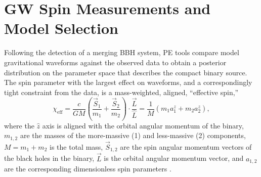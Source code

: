 \documentclass[modern,linenumbers]{aastex61}
\newcommand{\chieff}{\chi_\mathrm{eff}}
\newcommand{\checkme}[1]{\textcolor{red}{#1}}
\newcommand{\OOneSigmaIsoAligned}{\checkme{1.8}}
\newcommand{\OOneOddsIsoAligned}{\checkme{0.08}}
\newcommand{\OTwoSigmaIsoAlignedMin}{\checkme{3.0}}
\newcommand{\OTwoOddsIsoAlignedMin}{\checkme{0.0012}}
\begin{document}
\begin{abstract}
  The first direct detections of \acp{GW} from merging \acp{BBH} open
  a unique window into the formation environment of massive stars and
  their compact remnants.  One promising signature of the formation
  environment is the angular distribution of the \ac{BH} spins;
  systems formed through dynamical interacions among already-compact
  objects are expected to have isotropic spin orientations while
  binaries formed from pairs of stars born together are more likely to
  have spins aligned with the binary orbit as a consequence of their
  joint evolution toward a \ac{BBH} system.  By considering existing
  \ac{GW} measurements of $\chieff$, the best-measured combination of
  spin parameters, in the three likely binary black hole detections
  GW150914, LVT151012, and GW151226, we show that the data already
  exhibit a $\OOneSigmaIsoAligned\sigma$ ($\OOneOddsIsoAligned$ odds
  ratio) preference for an isotropic angular distribution amongst a
  suite of models for the spin distribution.  By considering the
  effect of an additional 10 detections drawn from the various models
  in the suite we show that such an agumented data set would enable at
  least a $\OTwoSigmaIsoAlignedMin\sigma$ ($\OTwoOddsIsoAlignedMin$
  odds ratio) distinction between the isotropic and aligned models,
  and in most cases better than $5\sigma$ ($2.9 \times 10^{-7}$ odds
  ratio).  The existing data strongly suggest a dynamical formation
  secnario for the observed systems, and this will be confirmed (or
  overturned) confidently in the near future by subsequent
  observations.
\end{abstract}

\acresetall{}

\section{\ac{GW} Spin Measurements and Model Selection}
\label{sec:O1}

Following the detection of a merging \ac{BBH} system, \ac{PE} tools
\citep{2015PhRvD..91d2003V} compare model gravitational waveforms
\citep{2014PhRvD..89h4006P,2014PhRvD..89f1502T,2014PhRvL.113o1101H}
against the observed data to obtain a posterior distribution on the
parameter space that describes the compact binary source.  The spin
parameter with the largest effect on waveforms, and a correspondingly
tight constraint from the data, is a mass-weighted, aligned,
``effective spin,''
\begin{equation}
  \chieff = \frac{c}{GM} \left( \frac{\vec{S}_1}{m_1} + \frac{\vec{S}_2}{m_2}
  \right) \cdot \frac{\vec{L}}{\hat{L}} = \frac{1}{M} \left( m_1 a_1^z + m_2 a_2^z \right),
\end{equation}
where the $\hat{z}$ axis is aligned with the orbital angular momentum
of the binary, $m_{1,2}$ are the masses of the more-massive (1) and
less-massive (2) components, $M = m_1 + m_2$ is the total mass,
$\vec{S}_{1,2}$ are the spin angular momentum vectors of the black
holes in the binary, $\vec{L}$ is the orbital angular momentum vector,
and $a_{1,2}$ are the corresponding dimensionless spin parameters
\citep{2016PhRvL.116x1102A}.
\end{document}
